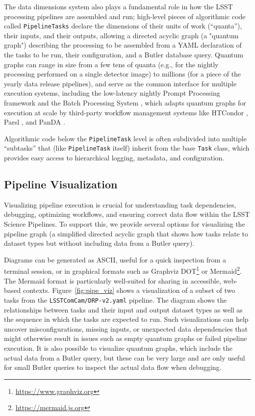 The data dimensions system also plays a fundamental role in how the LSST processing pipelines are assembled and run; high-level pieces of algorithmic code called \texttt{PipelineTasks} declare the dimensions of their units of work (``quanta''), their inputs, and their outputs, allowing a directed acyclic graph (a "quantum graph") describing the processing to be assembled from a YAML declaration of the tasks to be run, their configuration, and a Butler database query.
Quantum graphs can range in size from a few tens of quanta (e.g., for the nightly processing performed on a single detector image) to millions (for a piece of the yearly data release pipelines), and serve as the common interface for multiple execution systems, including the low-latency nightly Prompt Processing framework \citep{DMTN-219} and the Batch Processing System \citep[BPS;][]{2022arXiv221115795G}, which adapts quantum graphs for execution at scale by third-party workflow management systems like HTCondor \citep{2022zndo...2579447H}, Parsl \citep{10.1145/3307681.3325400}, and PanDA \citep{2024EPJWC.29504026K}.

Algorithmic code below the \texttt{PipelineTask} level is often subdivided into multiple ``subtasks'' that (like \texttt{PipelineTask} itself) inherit from the base \texttt{Task} class, which provides easy access to hierarchical logging, metadata, and configuration.

\subsection{Pipeline Visualization}
\label{sec:pipeline_visualization}

Visualizing pipeline execution is crucial for understanding task dependencies, debugging, optimizing workflows, and ensuring correct data flow within the LSST Science Pipelines.
To support this, we provide several options for visualizing the pipeline graph (a simplified directed acyclic graph that shows how tasks relate to dataset types but without including data from a Butler query).

Diagrams can be generated as ASCII, useful for a quick inspection from a terminal session, or in graphical formats such as Graphviz DOT\footnote{\url{https://www.graphviz.org}} or Mermaid\footnote{\url{https://mermaid.js.org}}.
The Mermaid format is particularly well-suited for sharing in accessible, web-based contexts.
Figure~\ref{fig:pipe_viz} shows a visualization of a subset of two tasks from the \texttt{LSSTComCam/DRP-v2.yaml} pipeline.
The diagram shows the relationships between tasks and their input and output dataset types as well as the sequence in which the tasks are expected to run.
Such visualizations can help uncover misconfigurations, missing inputs, or unexpected data dependencies that might otherwise result in issues such as empty quantum graphs or failed pipeline execution.
It is also possible to visualize quantum graphs, which include the actual data from a Butler query, but these can be very large and are only useful for small Butler queries to inspect the actual data flow when debugging.

